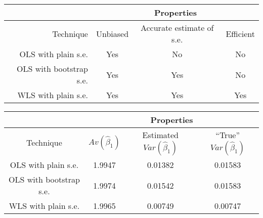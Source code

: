 \documentclass[12pt]{article}
\begin{document}
\pagestyle{empty}
{\newpage
\clearpage
\samepage \begin{tabular}{|r||c|c|c|}\hline
           & \multicolumn{3}{c|}{Properties} \\  \hline 
Technique  & Unbiased&Accurate estimate of s.e. & Efficient \\  \hline\hline
OLS with plain s.e.      & Yes   & No   & No \\ 
OLS with bootstrap s.e.  & Yes   & Yes   & No \\ 
WLS with plain s.e.      & Yes   & Yes   & Yes \\  \hline
\end{tabular}
}

{\newpage
\clearpage
\samepage \begin{tabular}{|c||c|c|c|} \hline
           & \multicolumn{3}{c|}{Properties} \\  \hline
Technique  & $Av(\hat\beta_1)$ & Estimated $Var(\hat\beta_1)$ 
& ``True''  $Var(\hat\beta_1)$ \\  \hline\hline
OLS with plain s.e.      & 1.9947   & 0.01382   & 0.01583 \\ 
OLS with bootstrap s.e.  & 1.9974   & 0.01542   & 0.01583 \\ 
WLS with plain s.e.      & 1.9965   & 0.00749   & 0.00747 \\  \hline
\end{tabular}
}
\end{document}
